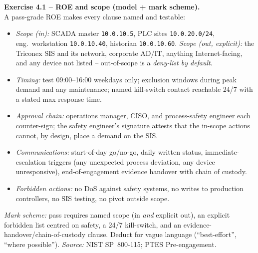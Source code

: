 \documentclass[11pt,a4paper]{article}
\begin{document}
\begin{solutionbox}
\textbf{Exercise 4.1 -- ROE and scope (model + mark scheme).}\\[2pt]
A pass-grade ROE makes every clause named and testable:
\begin{itemize}\setlength{\itemsep}{0pt}
  \item \emph{Scope (in):} SCADA master \texttt{10.0.10.5}, PLC sites \texttt{10.0.20.0/24}, eng.\
        workstation \texttt{10.0.10.40}, historian \texttt{10.0.10.60}.
        \emph{Scope (out, explicit):} the Triconex SIS and its network, corporate AD/IT, anything
        Internet-facing, and any device not listed -- out-of-scope is a \emph{deny-list by default}.
  \item \emph{Timing:} test 09:00--16:00 weekdays only; exclusion windows during peak demand and any
        maintenance; named kill-switch contact reachable 24/7 with a stated max response time.
  \item \emph{Approval chain:} operations manager, CISO, and process-safety engineer each
        counter-sign; the safety engineer's signature attests that the in-scope actions cannot, by
        design, place a demand on the SIS.
  \item \emph{Communications:} start-of-day go/no-go, daily written status, immediate-escalation
        triggers (any unexpected process deviation, any device unresponsive), end-of-engagement
        evidence handover with chain of custody.
  \item \emph{Forbidden actions:} no DoS against safety systems, no writes to production
        controllers, no SIS testing, no pivot outside scope.
\end{itemize}
\emph{Mark scheme:} pass requires named scope (in \emph{and} explicit out), an explicit forbidden
list centred on safety, a 24/7 kill-switch, and an evidence-handover/chain-of-custody clause.
Deduct for vague language (``best-effort'', ``where possible''). \emph{Source:} NIST SP~800-115;
PTES Pre-engagement.
\end{solutionbox}
\end{document}
